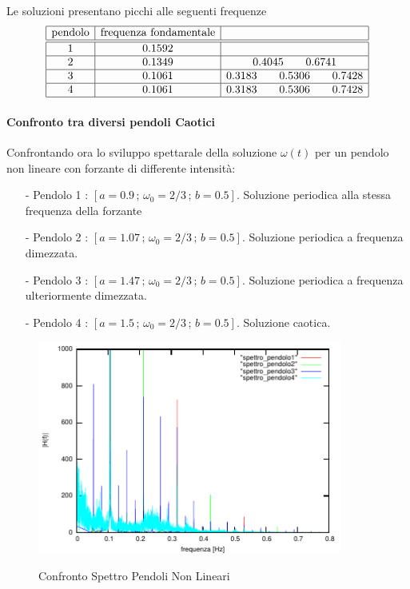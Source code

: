 \documentclass[13pt]{article}
\begin{document}
Le soluzioni presentano picchi alle seguenti frequenze
\begin{displaymath}
\centering
\begin{array}{|c|c|c|}
\hline
\textrm{pendolo} & \textrm{frequenza fondamentale} & \\
\hline
\hline
1 &  0.1592	&  \\
\hline
2 &  0.1349	&	0.4045	\qquad 0.6741  \\
\hline
3 &  0.1061	&	0.3183	\qquad 0.5306 \qquad 0.7428 \\
\hline
4 &  0.1061	&	0.3183	\qquad 0.5306 \qquad 0.7428 \\
\hline

\end{array}
\end{displaymath}


\clearpage
\paragraph{Confronto tra diversi pendoli Caotici}

Confrontando ora lo sviluppo spettarale della soluzione $\omega(t)$ per un pendolo non lineare con forzante di differente intensità: 

	\begin{itemize}
	\item[-] Pendolo 1 : $[ a = 0.9 \, ;\, \omega_{0} = 2/3 \, ;\, b = 0.5 ]$. Soluzione periodica alla stessa frequenza della forzante
	\item[-] Pendolo 2 : $[ a = 1.07 \, ;\, \omega_{0} = 2/3 \, ;\, b = 0.5 ]$. Soluzione periodica a frequenza dimezzata.
	\item[-] Pendolo 3 : $[ a = 1.47 \, ;\, \omega_{0} = 2/3 \, ;\, b = 0.5 ]$. Soluzione periodica a frequenza  ulteriormente dimezzata.
	\item[-] Pendolo 4 : $[ a = 1.5 \, ;\, \omega_{0} = 2/3 \, ;\, b = 0.5 ]$. Soluzione caotica.
	\end{itemize} 

\begin{figure}[!h]
\caption{Confronto Spettro Pendoli Non Lineari}
\includegraphics[width=10cm,keepaspectratio]{picture/spettro_tutto}
\centering
\label{fig:caotici}
\end{figure}
\end{document}
